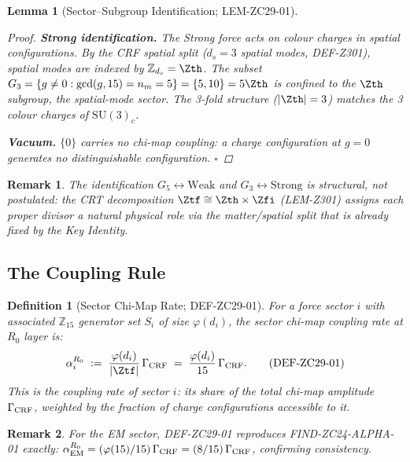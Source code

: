 \documentclass[12pt, a4paper]{article}
\newtheorem{lemma}{Lemma}[section]
\newtheorem{definition}{Definition}[section]
\newtheorem{remark}{Remark}[section]
\begin{document}
\begin{lemma}[Sector--Subgroup Identification; LEM-ZC29-01]
\begin{proof}
\textbf{Strong identification.}
The Strong force acts on colour charges in spatial configurations.
By the CRF spatial split ($d_s=3$ spatial modes, DEF-Z301),
spatial modes are indexed by $\mathbb{Z}_{d_s} = \Zth$.
The subset $G_3 = \{g\neq 0 : \gcd(g,15) = n_m = 5\}
= \{5,10\} = 5\Zth$ is confined to the $\Zth$ subgroup,
the spatial-mode sector.
The 3-fold structure ($|\Zth|=3$) matches the 3 colour charges
of $\mathrm{SU}(3)_c$.

\textbf{Vacuum.}
$\{0\}$ carries no chi-map coupling: a charge configuration at
$g=0$ generates no distinguishable configuration. \hfill$\square$
\end{proof}
\end{lemma}

\begin{remark}
The identification $G_5 \leftrightarrow \text{Weak}$ and
$G_3 \leftrightarrow \text{Strong}$ is structural, not postulated:
the CRT decomposition $\Ztf \cong \Zth \times \Zfi$ (LEM-Z301)
assigns each proper divisor a natural physical role via the
matter/spatial split that is already fixed by the Key Identity.
\end{remark}

\subsection{The Coupling Rule}
\label{zc29:sec:rule}

\begin{definition}[Sector Chi-Map Rate; DEF-ZC29-01]
\label{zc29:def:sector-rate}
For a force sector $i$ with associated $\mathbb{Z}_{15}$ generator
set $S_i$ of size $\varphi(d_i)$, the
\emph{sector chi-map coupling rate} at $R_0$ layer is:
\begin{equation}
  \alpha_i^{R_0}
  \;:=\;
  \frac{\varphi(d_i)}{|\Ztf|}\,\Gamma_{\rm CRF}
  \;=\;
  \frac{\varphi(d_i)}{15}\,\Gamma_{\rm CRF}.
  \tag{DEF-ZC29-01}\label{zc29:def:coupling}
\end{equation}
This is the coupling rate of sector $i$: its share of the total
chi-map amplitude $\Gamma_{\rm CRF}$, weighted by the fraction
of charge configurations accessible to it.
\end{definition}

\begin{remark}
For the EM sector, DEF-ZC29-01 reproduces FIND-ZC24-ALPHA-01 exactly:
$\alpha_{\rm EM}^{R_0} = (\varphi(15)/15)\,\Gamma_{\rm CRF}
= (8/15)\,\Gamma_{\rm CRF}$, confirming consistency.
\end{remark}
\end{document}
